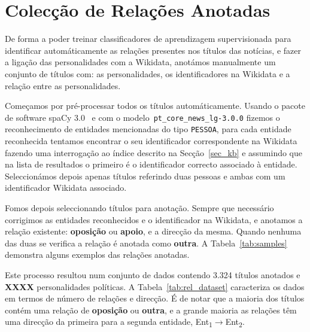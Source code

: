 \documentclass[a4paper, twocolumn, 11pt, twoside]{article}
\begin{document}


\section{Colecção de Relações Anotadas}
\label{sec:rel_data_annot}

De forma a poder treinar classificadores de aprendizagem supervisionada para identificar automáticamente as relações presentes nos títulos das notícias, e fazer a ligação das personalidades com a Wikidata, anotámos manualmente um conjunto de títulos com: as personalidades, os identificadores na Wikidata e a relação entre as personalidades.

Começamos por pré-processar todos os títulos automáticamente. Usando o pacote de software spaCy 3.0~\citep{spacy} e com o modelo~\texttt{pt\_core\_news\_lg-3.0.0} fizemos o reconhecimento de entidades mencionadas do tipo \texttt{PESSOA}, para cada entidade reconhecida tentamos encontrar o seu identificador correspondente na Wikidata fazendo uma interrogação ao índice descrito na Secção~\ref{sec_kb} e assumindo que na lista de resultados o primeiro é o identificador correcto associado à entidade. Seleccionámos depois apenas títulos referindo duas pessoas e ambas com um identificador Wikidata associado.

Fomos depois seleccionando títulos para anotação. Sempre que necessário corrigimos as entidades reconhecidos e o identificador na Wikidata, e anotamos a relação existente: \textbf{oposição} ou \textbf{apoio}, e a direcção da mesma. Quando nenhuma das duas se verifica a relação é anotada como \textbf{outra}. A Tabela~\ref{tab:samples} demonstra alguns exemplos das relações anotadas.

Este processo resultou num conjunto de dados contendo 3.324 títulos anotados e {\bf XXXX} personalidades políticas. A Tabela~\ref{tab:rel_dataset} caracteriza os dados em termos de número de relações e direcção. É de notar que a maioria dos títulos contém uma relação de \textbf{oposição} ou \textbf{outra}, e a grande maioria as relações têm uma direcção da primeira para a segunda entidade, Ent\textsubscript{1}$\rightarrow$Ent\textsubscript{2}.
\end{document}

